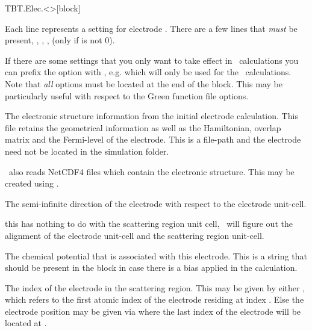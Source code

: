 \begin{fdfentry}{TBT.Elec.<>}[block]

  Each line represents a setting for electrode \fdf*{<>}.
  There are a few lines that \emph{must} be present, ,
  , ,  (only if
   is not $0$).

  If there are some settings that you only want to take effect in
  \tbtrans\ calculations you can prefix the option with
  , e.g. which will only be used for the \tbtrans\
  calculations. Note that \emph{all}  options must be
  located at the end of the block. This may be particularly useful
  with respect to the Green function file options.

  \begin{fdfoptions}

    \option[HS]%
    The electronic structure information from the initial
    electrode calculation. This file retains the geometrical
    information as well as the Hamiltonian, overlap matrix and the
    Fermi-level of the electrode.
    This is a file-path and the electrode  need not be
    located in the simulation folder.

    \tbtrans\ also reads NetCDF4 files which contain the electronic
    structure. This may be created using \sisl.

    The semi-infinite direction of the electrode with respect to the
    electrode unit-cell. 

    \note this has nothing to do with the scattering region unit cell,
    \tsiesta\ will figure out the alignment of the electrode unit-cell
    and the scattering region unit-cell.

    The chemical potential that is associated with this
    electrode. This is a string that should be present in the
     block in case there is a bias applied in the
    calculation. 

    The index of the electrode in the scattering region.
    This may be given by either , which refers to
    the first atomic index of the electrode residing at index
    . Else the electrode position may be given via
     where the last index of the electrode
    will be located at \fdf*{<idx>}.


\end{fdfoptions}
\end{fdfentry}
